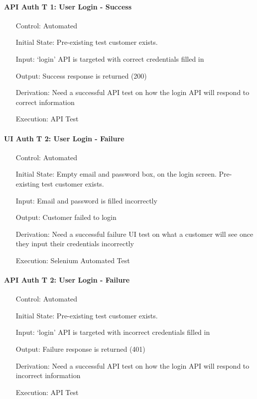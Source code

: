 \documentclass[12pt, titlepage]{article}
\begin{document}
\paragraph*{API Auth T 1: User Login - Success}
\begin{itemize}
	\item[Control:] Automated
	\item[Initial State:] Pre-existing test customer exists. 
	\item[Input:] `login' API is targeted with correct credentials filled in
	\item[Output:] Success response is returned (200)
	\item[Derivation:] Need a successful API test on how the login API will respond to correct information
	\item[Execution:] API Test
\end{itemize}

\paragraph*{UI Auth T 2: User Login - Failure}
\begin{itemize}
	\item[Control:] Automated
	\item[Initial State:] Empty email and password box, on the login screen. Pre-existing test customer exists. 
	\item[Input:] Email and password is filled incorrectly
	\item[Output:] Customer failed to login
	\item[Derivation:] Need a successful failure UI test on what a customer will see once they input their credentials incorrectly
	\item[Execution:] Selenium Automated Test
\end{itemize}

\paragraph*{API Auth T 2: User Login - Failure}
\begin{itemize}
	\item[Control:] Automated
	\item[Initial State:] Pre-existing test customer exists. 
	\item[Input:] `login' API is targeted with incorrect credentials filled in
	\item[Output:] Failure response is returned (401)
	\item[Derivation:] Need a successful API test on how the login API will respond to incorrect information
	\item[Execution:] API Test
\end{itemize}
\end{document}
